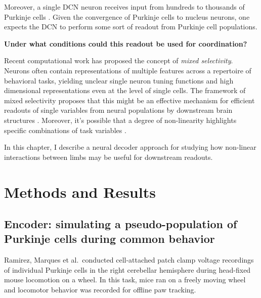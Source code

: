 Moreover, a single DCN neuron receives input from hundreds to thousands of Purkinje cells \cite{personSynchronyNeuralCoding2012}. Given the convergence of Purkinje cells to nucleus neurons, one expects the DCN to perform some sort of readout from Purkinje cell populations. 

\textbf{Under what conditions could this readout be used for coordination?}

Recent computational work has proposed the concept of \textit{mixed selectivity}. Neurons often contain representations of multiple features across a repertoire of behavioral tasks, yielding unclear single neuron tuning functions and high dimensional representations even at the level of single cells. The framework of mixed selectivity proposes that this might be an effective mechanism for efficient readouts of single variables from neural populations by downstream brain structures \cite{rigottiImportanceMixedSelectivity2013}. 
Moreover, it's possible that a degree of non-linearity highlights specific combinations of task variables \cite{johnstonNonlinearMixedSelectivity2020}.

In this chapter, I describe a neural decoder approach for studying how non-linear interactions between limbs may be useful for downstream readouts.






\section{Methods and Results}

\subsection{Encoder: simulating a pseudo-population of Purkinje cells during common behavior}

Ramirez, Marques et al.~conducted cell-attached patch clamp voltage recordings of individual Purkinje cells in the right cerebellar hemisphere during head-fixed mouse locomotion on a wheel. In this task, mice ran on a freely moving wheel and locomotor behavior was recorded for offline paw tracking.

